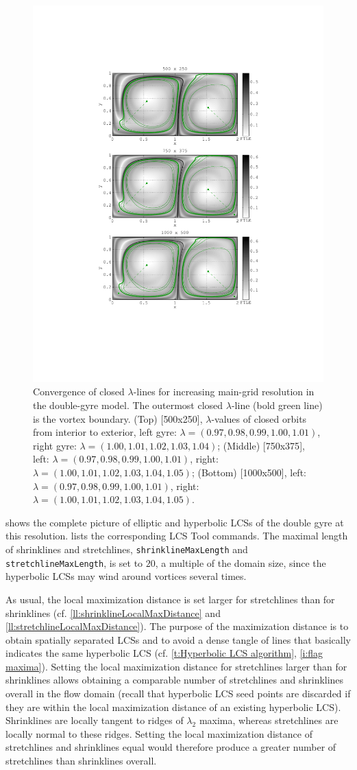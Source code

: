 \documentclass[5p]{elsarticle}
\begin{document}
\begin{figure}
\centering
\includegraphics[width=.475\textwidth]{graphics/double_gyre/lambda_lcs_convergence}\caption{Convergence of closed $\lambda$-lines for increasing main-grid resolution in the double-gyre model. The outermost closed $\lambda$-line (bold green line) is the vortex boundary. (Top) {[}500x250{]}, $\lambda$-values
of closed orbits from interior to exterior, left gyre: $\lambda=(0.97, 0.98, 0.99, 1.00, 1.01)$, right gyre: $\lambda=(1.00, 1.01, 1.02, 1.03, 1.04)$; (Middle) {[}750x375{]}, left: $\lambda=(0.97, 0.98, 0.99, 1.00, 1.01)$, right: $\lambda=(1.00, 1.01, 1.02, 1.03, 1.04, 1.05)$; (Bottom) {[}1000x500{]}, left: $\lambda=(0.97, 0.98, 0.99, 1.00, 1.01)$, right: $\lambda=(1.00, 1.01, 1.02, 1.03, 1.04, 1.05)$.}
\label{f:double gyre lambda LCS convergence}
\end{figure}

\begin{sloppypar}
 shows the complete picture of elliptic and hyperbolic LCSs of the double gyre at this resolution.  lists the corresponding LCS Tool commands. The maximal length of shrinklines and stretchlines, \lstinline!shrinklineMaxLength! and \lstinline!stretchlineMaxLength!, is set to $20$, a multiple of the domain size, since the hyperbolic LCSs may wind around vortices several times. 
\end{sloppypar}

As usual, the local maximization distance is set larger for stretchlines than for shrinklines (cf. \cref{ll:shrinklineLocalMaxDistance} and \cref{ll:stretchlineLocalMaxDistance}). The purpose of the maximization distance is to obtain spatially separated LCSs and to avoid a dense tangle of lines that basically indicates the same hyperbolic LCS (cf. \cref{t:Hyperbolic LCS algorithm}, \cref{i:flag maxima}). Setting the local maximization distance for stretchlines larger than for shrinklines allows obtaining a comparable number of stretchlines and shrinklines overall in the flow domain (recall that hyperbolic LCS seed points are discarded if they are within the local maximization distance of an existing hyperbolic LCS). Shrinklines are locally tangent to ridges of $\lambda_2$ maxima, whereas stretchlines are locally normal to these ridges. Setting the local maximization distance of stretchlines and shrinklines equal would therefore produce a greater number of stretchlines than shrinklines overall.
\end{document}
